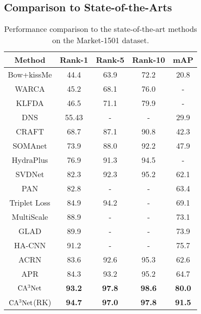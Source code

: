 \documentclass[sigconf]{acmart}
\begin{document}
\subsection{Comparison to State-of-the-Arts}\begin{table}[htbp]
	\begin{center}
		\newcommand{\tabincell}[2]{\begin{tabular}{@{}#1@{}}#2\end{tabular}}
		\begin{tabular}{|c|c|c|c|c|}
			\hline
			\textbf{Method}&\textbf{Rank-1}&\textbf{Rank-5}&\textbf{Rank-10}&\textbf{mAP}\\
			\hline
			Bow+kissMe\cite{17}&44.4&63.9&72.2&20.8\\
			\hline
			WARCA\cite{24}&45.2&68.1&76.0&-\\
			\hline
			KLFDA\cite{23}&46.5&71.1&79.9&-\\
			\hline
			DNS\cite{22}&55.43&-&-&29.9\\
			\hline
			CRAFT\cite{21}&68.7&87.1&90.8&42.3\\
			\hline
			\hline
			SOMAnet\cite{25}&73.9&88.0&92.2&47.9\\
			\hline
			HydraPlus\cite{27}&76.9&91.3&94.5&-\\
			\hline
			SVDNet\cite{26}&82.3&92.3&95.2&62.1\\
			\hline
			PAN\cite{28}&82.8&-&-&63.4\\
			\hline
			Triplet Loss\cite{29}&84.9&94.2&-&69.1\\
			\hline
			MultiScale \cite{30}&88.9&-&-&73.1\\
			\hline
			GLAD \cite{31}&89.9&-&-&73.9\\
			\hline
			HA-CNN\cite{7}&91.2&-&-&75.7\\
			\hline
			\hline
			ACRN \cite{11}&83.6&92.6&95.3&62.6\\
			\hline
			APR\cite{12}&84.3&93.2&95.2&64.7\\
			\hline
			\hline
			$\rm CA^3Net$&\textbf{93.2}&\textbf{97.8}&\textbf{98.6}&\textbf{80.0}\\
			\hline $\rm CA^3Net$(RK)&\textbf{94.7}&\textbf{97.0}&\textbf{97.8}&\textbf{91.5}\\
			\hline
		\end{tabular}
	\end{center}
	\caption{Performance comparison to the state-of-the-art methods on the Market-1501 dataset.}
\end{table}\begin{table}[htbp]

\end{table}
\end{document}
